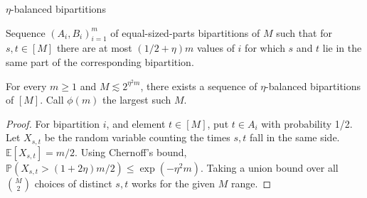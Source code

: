 \documentclass{beamer}
\newcommand{\1}{\mathbbm{1}}
\newcommand{\Exp}[1]{\mathbb{E}\left [#1 \right ]}
\newcommand{\Prob}{\mathbb{P}}
\begin{document}
\begin{frame}{$\eta$-balanced bipartitions}
  \begin{definition}
    Sequence $(A_i, B_i)_{i = 1}^m$ of equal-sized-parts bipartitions of $M$ such that
    for $s, t \in [M]$ there are at most $(1/2 + \eta)m$ values of $i$ for which $s$ and
    $t$ lie in the same part of the corresponding bipartition.
  \end{definition}

  \pause

  \begin{lemma}
    For every $m \ge 1$ and $M \lesssim 2^{\eta^2 m}$, there exists a sequence of
    $\eta$-balanced bipartitions of $[M]$. Call $\phi(m)$ the largest such $M$.
  \end{lemma}

  \pause

  \begin{proof}
    \pause
    For bipartition $i$, and element $t \in [M]$, put $t \in A_i$ with probability 1/2.
    \pause
    Let $X_{s, t}$ be the random variable counting the times $s, t$ fall in the same
    side.
    \pause
    $\Exp{X_{s, t}} = m/2$.
    \pause
    Using Chernoff's bound, $\Prob(X_{s, t} > (1 + 2 \eta)m/2) \le \exp(-\eta^2 m)$.
    \pause
    Taking a union bound over all ${M \choose 2}$ choices of distinct $s, t$ works for
    the given $M$ range.
  \end{proof}
\end{frame}
\end{document}

